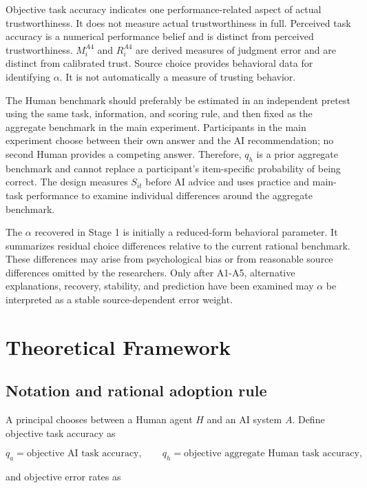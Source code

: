 \documentclass[11pt,a4paper]{article}
\begin{document}
Objective task accuracy indicates one performance-related aspect of actual trustworthiness. It does not measure actual trustworthiness in full. Perceived task accuracy is a numerical performance belief and is distinct from perceived trustworthiness. $M_i^{A4}$ and $R_i^{A4}$ are derived measures of judgment error and are distinct from calibrated trust. Source choice provides behavioral data for identifying $\alpha$. It is not automatically a measure of trusting behavior.

The Human benchmark should preferably be estimated in an independent pretest using the same task, information, and scoring rule, and then fixed as the aggregate benchmark in the main experiment. Participants in the main experiment choose between their own answer and the AI recommendation; no second Human provides a competing answer. Therefore, $q_h$ is a prior aggregate benchmark and cannot replace a participant's item-specific probability of being correct. The design measures $S_{it}$ before AI advice and uses practice and main-task performance to examine individual differences around the aggregate benchmark.

The $\alpha$ recovered in Stage 1 is initially a reduced-form behavioral parameter. It summarizes residual choice differences relative to the current rational benchmark. These differences may arise from psychological bias or from reasonable source differences omitted by the researchers. Only after A1-A5, alternative explanations, recovery, stability, and prediction have been examined may $\alpha$ be interpreted as a stable source-dependent error weight.

\section{Theoretical Framework}

\subsection{Notation and rational adoption rule}

A principal chooses between a Human agent $H$ and an AI system $A$. Define objective task accuracy as

\begin{equation*}
q_a=\text{objective AI task accuracy},\qquad
q_h=\text{objective aggregate Human task accuracy},
\end{equation*}

and objective error rates as
\end{document}
